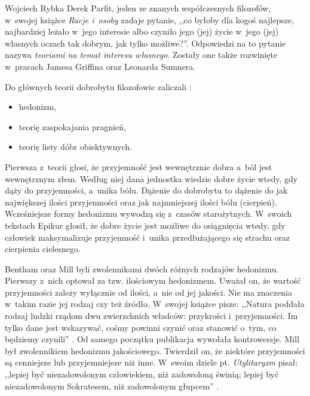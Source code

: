 \begin{artplenv}{Wojciech Rybka}
Derek Parfit, jeden ze znanych współczesnych filozofów, w~swojej książce \textit{Racje i~osoby}
\parencite*{parfit_racje_2012}
zadaje pytanie, ,,co byłoby dla kogoś najlepsze, najbardziej leżało w~jego interesie
albo czyniło jego (jej) życie w~jego (jej) własnych oczach tak dobrym, jak tylko możliwe?''. Odpowiedzi na to pytanie
nazywa \textit{teoriami na temat interesu własnego}. Zostały one także rozwinięte w~pracach Jamesa Griffina oraz
Leonarda Sumnera. 

Do głównych teorii dobrobytu filozofowie zaliczali
\parencite{brey_well-being_2012}:

\begin{itemize}
\item hedonizm,
\item teorię zaspokajania pragnień,
\item teorię listy dóbr obiektywnych.
\end{itemize}

Pierwsza z~teorii głosi, że przyjemność jest wewnętrznie dobra a~ból jest wewnętrznym złem. Według niej dana jednostka
wiedzie dobre życie wtedy, gdy dąży do przyjemności, a~unika bólu. Dążenie do dobrobytu to dążenie do jak największej
ilości przyjemności oraz jak najmniejszej ilości bólu (cierpień). Wcześniejsze formy hedonizmu wywodzą się z~czasów
starożytnych. W~swoich tekstach Epikur głosił, że dobre życie jest możliwe do osiągnięcia wtedy, gdy człowiek
maksymalizuje przyjemność i~unika przedłużającego się strachu oraz cierpienia cielesnego. 

Bentham oraz Mill byli zwolennikami dwóch różnych rodzajów hedonizmu. Pierwszy z~nich optował za tzw. ilościowym
hedonizmem. Uważał on, że wartość przyjemności zależy wyłącznie od ilości, a~nie od jej jakości. Nie ma
znaczenia w~takim razie jej rodzaj czy też źródło. W~swojej książce pisze: ,,Natura poddała rodzaj ludzki rządom dwu zwierzchnich
władców: przykrości i~przyjemności. Im tylko dane jest wskazywać, cośmy powinni czynić oraz stanowić o~tym, co będziemy
czynili''
\parencite[s.~17]{bentham_wprowadzenie_1958}.
Od samego początku publikacja wywołała kontrowersje. Mill był
zwolennikiem hedonizmu jakościowego. Twierdził on, że niektóre przyjemności są cenniejsze lub przyjemniejsze niż inne.
W~swoim dziele pt. \textit{Utylitaryzm} pisał: ,,lepiej być niezadowolonym człowiekiem, niż zadowoloną świnią; lepiej
być niezadowolonym Sokratesem, niż zadowolonym głupcem''
\parencite[s.~18]{mill_utylitaryzm:_1959}.


\end{artplenv}
